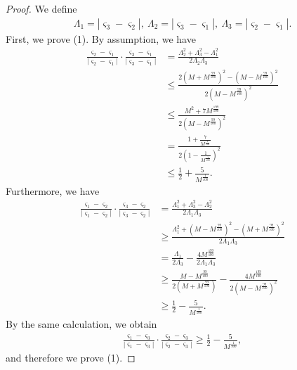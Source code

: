 \documentclass[reqno]{amsart}
\theoremstyle{plain}
\theoremstyle{definition}
\numberwithin{equation}{section}
\newcommand{\1}{\mathbbm{1}}
\begin{document}
\begin{proof}
We define
\begin{align*}
\Lambda_1=|\varsigma_3-\varsigma_2|,\ \Lambda_2=|\varsigma_3-\varsigma_1|,\ \Lambda_3=|\varsigma_2-\varsigma_1|.
\end{align*}
First, we prove (1). By assumption, we have
\begin{align*}
\frac{\varsigma_2-\varsigma_1}{|\varsigma_2-\varsigma_1|}\cdot \frac{\varsigma_3-\varsigma_1}{|\varsigma_3-\varsigma_1|}&=\frac{\Lambda_2^2+\Lambda_3^2-\Lambda_1^2}{2\Lambda_2\Lambda_3}
\\
&\leq \frac{ 2(M+M^{\frac{99}{100}})^2-(M-M^{\frac{99}{100}})^2}{2(M-M^{\frac{99}{100}})^2}
\\
&\leq \frac{ M^2+7M^{\frac{199}{100}}}{2(M-M^{\frac{99}{100}})^2}
\\
&=\frac{ 1+\frac{7}{M^{\frac{1}{100}}}}{2\left(1-\frac{1}{M^{\frac{1}{100}}}\right)^2}
\\
&\leq \frac{1}{2}+\frac{5}{M^{\frac{1}{100}}}.
\end{align*}
Furthermore, we have
\begin{align*}
\frac{\varsigma_1-\varsigma_2}{|\varsigma_1-\varsigma_2|}\cdot \frac{\varsigma_3-\varsigma_2}{|\varsigma_3-\varsigma_2|}&=\frac{\Lambda_1^2+\Lambda_3^2-\Lambda_2^2}{2\Lambda_1\Lambda_3}
\\
&\geq \frac{ \Lambda_1^2+(M-M^{\frac{99}{100}})^2-(M+M^{\frac{99}{100}})^2}{2\Lambda_1\Lambda_3}
\\
&=\frac{\Lambda_1}{2\Lambda_3}-\frac{4M^{\frac{199}{100}}}{2\Lambda_1\Lambda_3}
\\
&\geq \frac{ M-M^{\frac{99}{100}}}{2(M+M^{\frac{99}{100}})}-\frac{4M^{\frac{199}{100}}}{2(M-M^{\frac{99}{100}})^2}
\\
&\geq \frac{1}{2}-\frac{5}{M^{\frac{1}{100}}}.
\end{align*}
By the same calculation, we obtain
\begin{align*}
\frac{\varsigma_1-\varsigma_3}{|\varsigma_1-\varsigma_3|}\cdot \frac{\varsigma_2-\varsigma_3}{|\varsigma_2-\varsigma_3|}\geq \frac{1}{2}-\frac{5}{M^{\frac{1}{100}}},
\end{align*}
and therefore we prove (1).


\end{proof}
\end{document}
